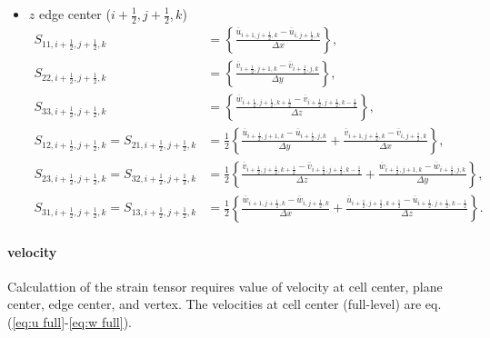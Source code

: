 \begin{itemize}
  \item $z$ edge center ($i+\frac{1}{2},j+\frac{1}{2},k$)
    \begin{align}
      S_{11,i+\frac{1}{2},j+\frac{1}{2},k} &= \left\{
      \frac{\overline{u}_{i+1,j+\frac{1}{2},k}-\overline{u}_{i,j+\frac{1}{2},k}}{\Delta x}
      \right\}, \\
      S_{22,i+\frac{1}{2},j+\frac{1}{2},k} &= \left\{
      \frac{\overline{v}_{i+\frac{1}{2},j+1,k}-\overline{v}_{i+\frac{1}{2},j,k}}{\Delta y}
      \right\}, \\
      S_{33,i+\frac{1}{2},j+\frac{1}{2},k} &= \left\{
      \frac{\overline{w}_{i+\frac{1}{2},j+\frac{1}{2},k+\frac{1}{2}}-\overline{v}_{i+\frac{1}{2},j+\frac{1}{2},k-\frac{1}{2}}}{\Delta z}
      \right\}, \\
      S_{12,i+\frac{1}{2},j+\frac{1}{2},k} = S_{21,i+\frac{1}{2},j+\frac{1}{2},k} &= \frac{1}{2}\left\{
      \frac{\overline{u}_{i+\frac{1}{2},j+1,k}-\overline{u}_{i+\frac{1}{2},j,k}}{\Delta y}
     +\frac{\overline{v}_{i+1,j+\frac{1}{2},k}-\overline{v}_{i,j+\frac{1}{2},k}}{\Delta x}
      \right\}, \\
      S_{23,i+\frac{1}{2},j+\frac{1}{2},k} = S_{32,i+\frac{1}{2},j+\frac{1}{2},k} &= \frac{1}{2}\left\{
      \frac{\overline{v}_{i+\frac{1}{2},j+\frac{1}{2},k+\frac{1}{2}}-\overline{v}_{i+\frac{1}{2},j+\frac{1}{2},k-\frac{1}{2}}}{\Delta z}
     +\frac{\overline{w}_{i+\frac{1}{2},j+1,k}-\overline{w}_{i+\frac{1}{2},j,k}}{\Delta y}
      \right\}, \\
      S_{31,i+\frac{1}{2},j+\frac{1}{2},k} = S_{13,i+\frac{1}{2},j+\frac{1}{2},k} &= \frac{1}{2}\left\{
      \frac{\overline{w}_{i+1,j+\frac{1}{2},k}-\overline{w}_{i,j+\frac{1}{2},k}}{\Delta x}
     +\frac{\overline{u}_{i+\frac{1}{2},j+\frac{1}{2},k+\frac{1}{2}}-\overline{u}_{i+\frac{1}{2},j+\frac{1}{2},k-\frac{1}{2}}}{\Delta z}
      \right\}.
    \end{align}
\end{itemize}


\paragraph{velocity}
Calculattion of the strain tensor
requires value of velocity
at cell center, plane center, edge center, and vertex.
The velocities at cell center (full-level) are eq.(\ref{eq:u full}-\ref{eq:w full}).

